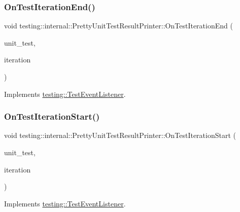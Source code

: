 \subsubsection{\texorpdfstring{On\+Test\+Iteration\+End()}{OnTestIterationEnd()}}
{\footnotesize\ttfamily void testing\+::internal\+::\+Pretty\+Unit\+Test\+Result\+Printer\+::\+On\+Test\+Iteration\+End (\begin{DoxyParamCaption}\item[{const \hyperlink{classtesting_1_1_unit_test}{Unit\+Test} \&}]{unit\+\_\+test,  }\item[{int}]{iteration }\end{DoxyParamCaption})\hspace{0.3cm}{\ttfamily [virtual]}}



Implements \hyperlink{classtesting_1_1_test_event_listener_a550fdb3e55726e4cefa09f5697941425}{testing\+::\+Test\+Event\+Listener}.

\mbox{\label{classtesting_1_1internal_1_1_pretty_unit_test_result_printer_abdba10a8c97e272ab4cee97cb652c957}} 
\subsubsection{\texorpdfstring{On\+Test\+Iteration\+Start()}{OnTestIterationStart()}}
{\footnotesize\ttfamily void testing\+::internal\+::\+Pretty\+Unit\+Test\+Result\+Printer\+::\+On\+Test\+Iteration\+Start (\begin{DoxyParamCaption}\item[{const \hyperlink{classtesting_1_1_unit_test}{Unit\+Test} \&}]{unit\+\_\+test,  }\item[{int}]{iteration }\end{DoxyParamCaption})\hspace{0.3cm}{\ttfamily [virtual]}}



Implements \hyperlink{classtesting_1_1_test_event_listener_a60cc09b7907cb329d152eb5e7133bdeb}{testing\+::\+Test\+Event\+Listener}.

